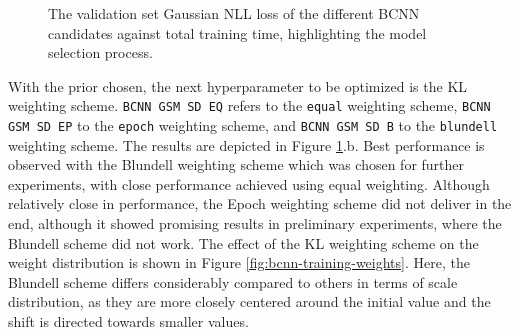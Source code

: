 \begin{figure}[H]
	\centering
	\caption{The validation set Gaussian NLL loss of the different BCNN candidates against total training time, highlighting the model selection process.}
	\label{fig:convergence-bcnn}
\end{figure}

With the prior chosen, the next hyperparameter to be optimized is the KL weighting scheme. \texttt{BCNN GSM SD EQ} refers to the \texttt{equal} weighting scheme, \texttt{BCNN GSM SD EP} to the \texttt{epoch} weighting scheme, and \texttt{BCNN GSM SD B} to the \texttt{blundell} weighting scheme. The results are depicted in Figure \ref{fig:convergence-bcnn}.b. Best performance is observed with the Blundell weighting scheme which was chosen for further experiments, with close performance achieved using equal weighting. Although relatively close in performance, the Epoch weighting scheme did not deliver in the end, although it showed promising results in preliminary experiments, where the Blundell scheme did not work. The effect of the KL weighting scheme on the weight distribution is shown in Figure \ref{fig:bcnn-training-weights}. Here, the Blundell scheme differs considerably compared to others in terms of scale distribution, as they are more closely centered around the initial value and the shift is directed towards smaller values. 

